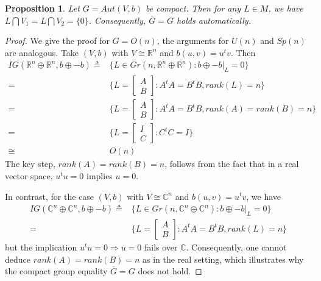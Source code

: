 \documentclass{article}
\newtheorem{prop}{Proposition}[section]
\begin{document}
\begin{prop}
Let $G=Aut(V,b)$ be compact. Then  for any $L \in M$,  we have $L \bigcap V_1=L \bigcap V_2=\{0\}$. Consequently, $\overline{G}=G$ holds automatically.
\end{prop}
\begin{proof}
We give the proof for $G=O(n)$, the arguments for $U(n)$ and $Sp(n)$ are analogous. Take $(V,b)$ with $V \cong \mathbb{R}^n$ and $b(u,v)=u^tv$. Then
\begin{align}
IG(\mathbb{R}^n \oplus \mathbb{R}^n, b\oplus-b) \triangleq  &  \{L \in Gr(n, \mathbb{R}^n \oplus \mathbb{R}^n) : b\oplus-b|_{L}=0\} \nonumber\\
=   & \{L=\left[
\begin{array}{cc}
A \\
B \end{array} \right]: A^tA=B^tB, rank(L)=n\} \nonumber \\
=   & \{L=\left[
\begin{array}{cc}
A \\
B \end{array} \right]: A^tA=B^tB, rank(A)=rank(B)=n\} \nonumber \\
=   & \{L=\left[
\begin{array}{cc}
I \\
C \end{array} \right]: C^tC=I\} \nonumber \\
\cong   & O(n) \nonumber
\end{align}
The key step, $rank(A)=rank(B)=n$, follows from the fact that in a real vector space, $u^tu=0$ implies $u=0$.


In contrast, for the case $(V,b)$ with $V \cong \mathbb{C}^n$ and $b(u,v)=u^tv$, we have
\begin{align}
IG(\mathbb{C}^n \oplus \mathbb{C}^n, b\oplus-b) \triangleq  &  \{L \in Gr(n, \mathbb{C}^n \oplus \mathbb{C}^n) : b\oplus-b|_{L}=0\} \nonumber\\
=   & \{L=\left[
\begin{array}{cc}
A \\
B \end{array} \right]: A^tA=B^tB, rank(L)=n\} \nonumber
\end{align}
but the implication $u^tu=0 \Rightarrow u=0$ fails over $\mathbb{C}$. Consequently, one cannot deduce
$rank(A)=rank(B)=n$ as in the real setting, which illustrates why the compact group equality $\overline{G}=G$ does not hold.
\end{proof}
\end{document}
